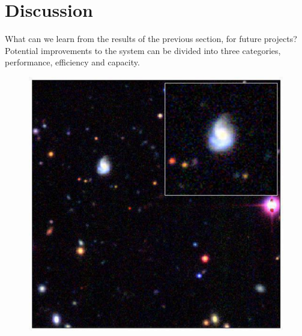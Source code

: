 \documentclass[useAMS,usenatbib,a4paper]{mn2e}
\begin{document}

\section{Discussion}
\label{sec:discuss}

What can we learn from the results of the previous section, for future
projects? Potential improvements to the \SW system can be divided into three
categories, performance, efficiency and capacity.


\begin{figure}
\begin{minipage}{\linewidth}
  \begin{minipage}[t]{0.47\linewidth}
    \begin{minipage}{0.46\linewidth}
      \centering\includegraphics[width=\linewidth]{ASW0008wyp_gri.pdf}
    \end{minipage}\hfill
    \begin{minipage}{0.50\linewidth}

\end{minipage}
\end{minipage}
\end{minipage}
\end{figure}
\end{document}
